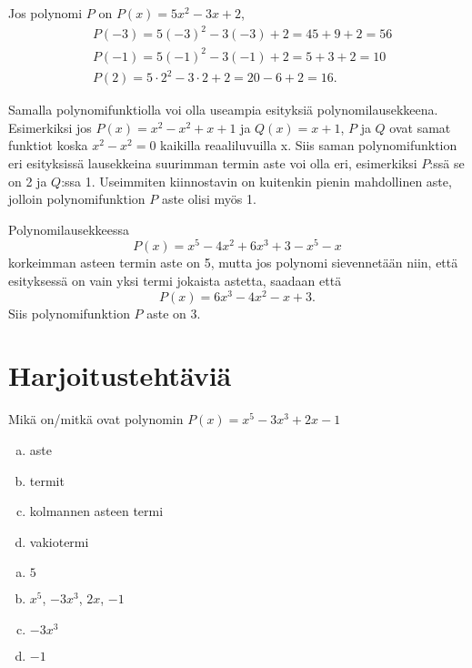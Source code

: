 \begin{esimerkki}
Jos polynomi $P$ on $P(x) = 5x^2-3x+2$,
\begin{align*}
&P(-3) = 5(-3)^2-3(-3)+2 = 45 + 9 + 2 = 56 \\
&P(-1) = 5(-1)^2-3(-1)+2 = 5 + 3 + 2 = 10 \\
&P(2) = 5\cdot 2^2-3\cdot 2+2 = 20 - 6 + 2 = 16.
\end{align*}
\end{esimerkki}

Samalla polynomifunktiolla voi olla useampia esityksiä polynomilausekkeena.
Esimerkiksi jos $P(x) = x^2-x^2+x+1$ ja $Q(x) = x+1$, $P$ ja $Q$ ovat samat
funktiot koska $x^2 - x^2 = 0$ kaikilla reaaliluvuilla x. Siis saman
polynomifunktion eri esityksissä lausekkeina suurimman termin aste voi olla
eri, esimerkiksi $P$:ssä se on 2 ja $Q$:ssa 1. Useimmiten kiinnostavin on
kuitenkin pienin mahdollinen aste, jolloin polynomifunktion $P$ aste olisi
myös 1.

\begin{esimerkki}
Polynomilausekkeessa
\[P(x) = x^5-4x^2+6x^3+3-x^5-x\]
korkeimman asteen termin aste on 5, mutta jos polynomi sievennetään niin, että
esityksessä on vain yksi termi jokaista astetta, saadaan että
\[P(x) = 6x^3-4x^2-x+3.\]
Siis polynomifunktion $P$ aste on 3.
\end{esimerkki}


\section{Harjoitustehtäviä}

\begin{tehtava}
	Mikä on/mitkä ovat polynomin $P(x) = x^5-3x^3+2x-1$
	\begin{enumerate}[a)]
		\item aste
		\item termit
		\item kolmannen asteen termi
		\item vakiotermi
	\end{enumerate}

	\begin{vastaus}
		\begin{enumerate}[a)]
			\item $5$
			\item $x^5$, $-3x^3$, $2x$, $-1$
			\item $-3x^3$
			\item $-1$
		\end{enumerate}
	\end{vastaus}
\end{tehtava}

